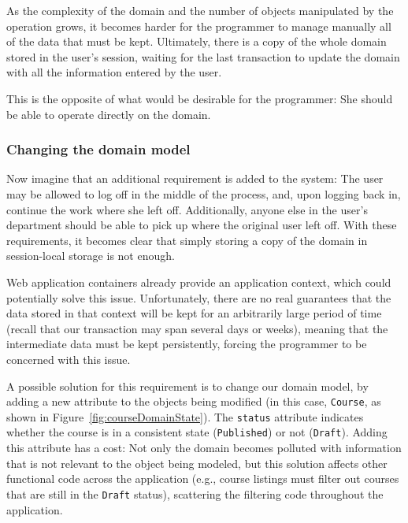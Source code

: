 \documentclass{llncs}
\begin{document}
As the complexity of the domain and the number of objects manipulated
by the operation grows, it becomes harder for the programmer to manage
manually all of the data that must be kept. Ultimately, there is a
copy of the whole domain stored in the user's session, waiting for the
last transaction to update the domain with all the information entered
by the user.

This is the opposite of what would be desirable for the programmer:
She should be able to operate directly on the domain.

\subsubsection{Changing the domain model}

Now imagine that an additional requirement is added to the system: The
user may be allowed to log off in the middle of the process, and, upon
logging back in, continue the work where she left off. Additionally,
anyone else in the user's department should be able to pick up where
the original user left off. With these requirements, it becomes clear
that simply storing a copy of the domain in session-local storage is
not enough.

Web application containers already provide an application context,
which could potentially solve this issue. Unfortunately, there are no
real guarantees that the data stored in that context will be kept for
an arbitrarily large period of time (recall that our transaction may
span several days or weeks), meaning that the intermediate data must
be kept persistently, forcing the programmer to be concerned with this
issue.

A possible solution for this requirement is to change our domain
model, by adding a new attribute to the objects being modified (in
this case, \texttt{Course}, as shown in
Figure~\ref{fig:courseDomainState}). The \texttt{status} attribute
indicates whether the course is in a consistent state
(\texttt{Published}) or not (\texttt{Draft}). Adding this attribute
has a cost: Not only the domain becomes polluted with information that
is not relevant to the object being modeled, but this solution affects
other functional code across the application (e.g., course listings
must filter out courses that are still in the \texttt{Draft} status),
scattering the filtering code throughout the application.
\end{document}
